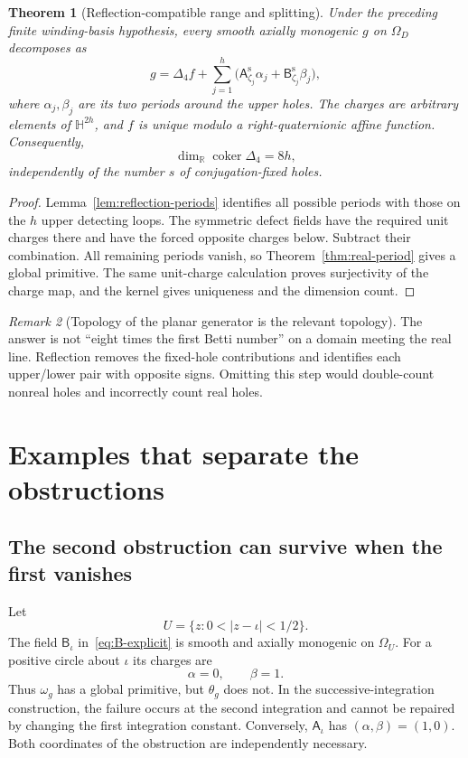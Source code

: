 \documentclass[11pt,a4paper]{article}
\numberwithin{equation}{section}
\newtheorem{theorem}{Theorem}[section]
\theoremstyle{definition}
\theoremstyle{remark}
\newtheorem{remark}[theorem]{Remark}
\newcommand{\R}{\mathbb R}
\newcommand{\HH}{\mathbb H}
\newcommand{\Lap}{\Delta_4}
\newcommand{\Adef}{\mathsf A}
\newcommand{\Bdef}{\mathsf B}
\newcommand{\Asym}{\mathsf A^{\mathrm s}}
\newcommand{\Bsym}{\mathsf B^{\mathrm s}}
\begin{document}
\begin{theorem}[Reflection-compatible range and splitting]
\label{thm:reflection-range}
Under the preceding finite winding-basis hypothesis, every smooth
axially monogenic $g$ on $\Omega_D$ decomposes as
\begin{equation}
 g=\Lap f+\sum_{j=1}^h
       \bigl(\Asym_{\zeta_j}\alpha_j+\Bsym_{\zeta_j}\beta_j\bigr),
 \label{eq:real-decomp}
\end{equation}
where $\alpha_j,\beta_j$ are its two periods around the upper holes.
The charges are arbitrary elements of $\HH^{2h}$, and $f$ is unique
modulo a right-quaternionic affine function. Consequently,
\begin{equation}
 \dim_{\R}\operatorname{coker}\Lap=8h,
 \label{eq:real-codim}
\end{equation}
independently of the number $s$ of conjugation-fixed holes.
\end{theorem}
\begin{proof}
Lemma~\ref{lem:reflection-periods} identifies all possible periods with
those on the $h$ upper detecting loops. The symmetric defect fields
have the required unit charges there and have the forced opposite
charges below. Subtract their combination. All remaining periods
vanish, so Theorem~\ref{thm:real-period} gives a global primitive.
The same unit-charge calculation proves surjectivity of the charge
map, and the kernel gives uniqueness and the dimension count.
\end{proof}

\begin{remark}[Topology of the planar generator is the relevant topology]
The answer is not ``eight times the first Betti number'' on a domain
meeting the real line. Reflection removes the fixed-hole contributions
and identifies each upper/lower pair with opposite signs. Omitting this
step would double-count nonreal holes and incorrectly count real holes.
\end{remark}

\section{Examples that separate the obstructions}
\label{sec:examples}

\subsection{The second obstruction can survive when the first vanishes}
Let
\[
 U=\{z:0<|z-\iota|<1/2\}.
\]
The field $\Bdef_\iota$ in~\eqref{eq:B-explicit} is smooth and axially
monogenic on $\Omega_U$. For a positive circle about $\iota$ its
charges are
\[
 \alpha=0,\qquad\beta=1.
\]
Thus $\omega_g$ has a global primitive, but $\theta_g$ does not.
In the successive-integration construction, the failure occurs at the
second integration and cannot be repaired by changing the first
integration constant. Conversely, $\Adef_\iota$ has $(\alpha,\beta)=(1,0)$.
Both coordinates of the obstruction are independently necessary.
\end{document}
